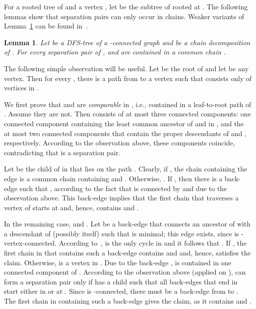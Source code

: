 \documentclass[paper=a4]{scrartcl}
\newtheorem{lemma}{Lemma}
\newcommand{\mqed}{\hfill}
\newlength{\proofpostskipamount}\newlength{\proofpreskipamount}
\newenvironment{proof}{\par\vspace{\proofpreskipamount}\noindent{\textbf{Proof:}}\hspace{0.5em}}{\nopagebreak \strut\nopagebreak \hspace{\fill}\mqed\par\vspace{\proofpostskipamount}\noindent}
\begin{document}
For a rooted tree  of  and a vertex , let  be the subtree of  rooted at . The following lemmas show that separation pairs can only occur in chains. Weaker variants of Lemma~\ref{lem:separationpair} can be found in~\cite{Hopcroft1973,Vo1983,Vo1983a}.



\begin{lemma}\label{lem:separationpair}
Let  be a DFS-tree of a -connected graph  and  be a chain decomposition of . For every separation pair  of ,  and  are contained in a common chain .
\end{lemma}
\begin{proof} The following simple observation will be useful. Let  be the root of  and let  be any vertex. Then for every , there is a path  from  to a vertex  such that  consists only of vertices in .


We first prove that  and  are \emph{comparable} in , i.e., contained in a leaf-to-root path of . Assume they are not. Then  consists of at most three connected components: one connected component containing the least common ancestor of  and  in , and the at most two connected components that contain the proper descendants of  and , respectively. According to the observation above,
these components coincide, contradicting that  is a separation pair.

Let  be the child of  in  that lies on the path . Clearly, if , the chain containing the edge  is a common chain containing  and . Otherwise, . If , then there is a back-edge  such that , according to the fact that  is connected by  and due to the observation above. This back-edge  implies that the first chain  that traverses a vertex of  starts at  and, hence, contains  and .

In the remaining case,  and . Let  be a back-edge that connects an ancestor  of  with a descendant  of  (possibly  itself) such that  is minimal; this edge  exists, since  is -vertex-connected. According to~\cite{Schmidt2013a},  is the only cycle in  and it follows that . If , the first chain  in  that contains such a back-edge contains  and  and, hence, satisfies the claim. Otherwise,  is a vertex in . Due to the back-edge ,  is contained in one connected component of . According to the observation above (applied on ),  can form a separation pair only if  has a child  such that all back-edges that end in  start either in  or at . Since  is -connected, there must be a back-edge from  to . The first chain  in  containing such a back-edge gives the claim, as it contains  and .
\end{proof}
\end{document}
